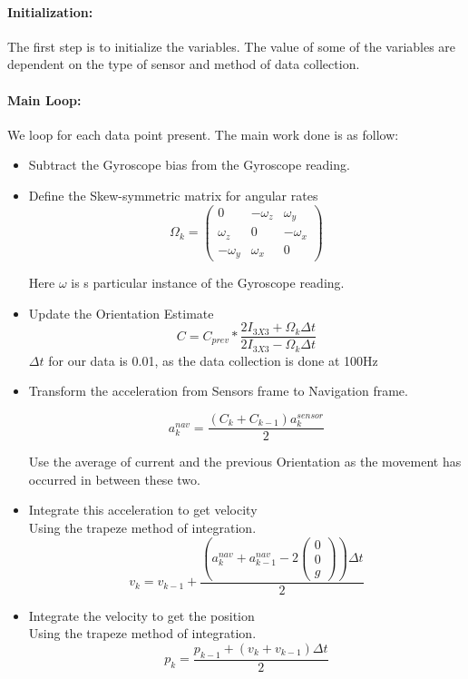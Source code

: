 \documentclass[12pt]{article}
\begin{document}
\paragraph{Initialization:} The first step is to initialize the variables. The value of some of the variables are dependent on the type of sensor and method of data collection.

\paragraph{Main Loop:} We loop for each data point present. The main work done is as follow:
\begin{itemize}
\item Subtract the Gyroscope bias from the Gyroscope reading.
\item Define the Skew-symmetric matrix for angular rates
\begin{equation}
\Omega_k = 
\begin{pmatrix}
0 & -\omega_z & \omega_y\\
\omega_z & 0 & -\omega_x\\
-\omega_y & \omega_x & 0
\end{pmatrix}
\end{equation}

Here $ \omega $ is s particular instance of the Gyroscope reading.

\item Update the Orientation Estimate
\begin{equation}
C = C_{prev}*\frac{2I_{3X3}+\Omega_k \Delta t}{2I_{3X3}-\Omega_k \Delta t}
\end{equation}
$ \Delta t $ for our data is 0.01, as the data collection is done at 100Hz

\item Transform the acceleration from Sensors frame to Navigation frame.	

\begin{equation}
a_k^{nav} = \frac{(C_k + C_{k-1})a_k^{sensor}}{2}
\end{equation}

Use the average of current and the previous Orientation as the movement has occurred in between these two.

\item Integrate this acceleration to get velocity\\
Using the trapeze method of integration.
\begin{equation}
v_k = v_{k-1}+\frac{(a_k^{nav}+a_{k-1}^{nav}-2\begin{pmatrix}
0\\0\\g
\end{pmatrix}
)\Delta t}{2}
\end{equation}
\item Integrate the velocity to get the position\\
Using the trapeze method of integration.
\begin{equation}
p_k = \frac{p_{k-1}+(v_k+v_{k-1}) \Delta t}{2}
\end{equation}


\end{itemize}
\end{document}
